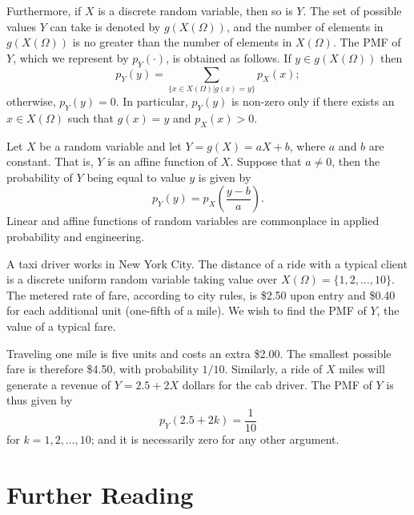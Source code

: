 Furthermore, if $X$ is a discrete random variable, then so is $Y$.
The set of possible values $Y$ can take is denoted by $g(X(\Omega))$, and the number of elements in $g(X(\Omega))$ is no greater than the number of elements in $X(\Omega)$.
The PMF of $Y$, which we represent by $p_Y (\cdot)$, is obtained as follows.
If $y \in g(X(\Omega))$ then
\begin{equation} \label{equation:DefinitionFunctionPMF}
p_Y (y) = \sum_{ \{x \in X(\Omega) | g(x) = y \} } p_X (x) ;
\end{equation}
otherwise, $p_Y (y) = 0$.
In particular, $p_Y (y)$ is non-zero only if there exists an $x \in X(\Omega)$ such that $g(x) = y$ and $p_X (x) > 0$.

\begin{example}
Let $X$ be a random variable and let $Y = g(X) = aX + b$, where $a$ and $b$ are constant.
That is, $Y$ is an affine function of $X$.
Suppose that $a \neq 0$, then the probability of $Y$ being equal to value $y$ is given by
\begin{equation*}
p_Y(y) = p_X \left( \frac{ y - b }{a} \right) .
\end{equation*}
Linear and affine functions of random variables are commonplace in applied probability and engineering.
\end{example}

\begin{example}
A taxi driver works in New York City.
The distance of a ride with a typical client is a discrete uniform random variable taking value over $X(\Omega) = \{ 1, 2, \ldots, 10 \}$.
The metered rate of fare, according to city rules, is \$2.50 upon entry and \$0.40 for each additional unit (one-fifth of a mile).
We wish to find the PMF of $Y$, the value of a typical fare.

Traveling one mile is five units and costs an extra \$2.00.
The smallest possible fare is therefore \$4.50, with probability $1/10$.
Similarly, a ride of $X$ miles will generate a revenue of $Y = 2.5 + 2X$ dollars for the cab driver.
The PMF of $Y$ is thus given by
\begin{equation*}
p_Y (2.5 + 2k) = \frac{1}{10}
\end{equation*}
for $k = 1, 2, \ldots, 10$;
and it is necessarily zero for any other argument.
\end{example}


\section*{Further Reading}

